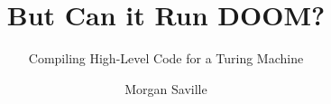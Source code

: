 \documentclass[twoside]{scrbook}
\begin{document}
    \title{But Can it Run DOOM?}
    \subtitle{Compiling High-Level Code for a Turing Machine}
    \author{Morgan Saville}
    \date{}
    \frontmatter
    \maketitle
    \tableofcontents
    \mainmatter
    
    
    
    
    
\end{document}
